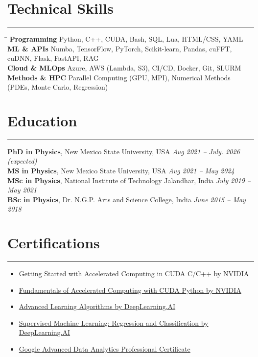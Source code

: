 \documentclass[11pt]{article}
\begin{document}
\section*{Technical Skills}
\hrule
\vspace{-0.3em}
\begin{tabbing}
\hspace{3.5cm} \= \kill
\textbf{Programming} \> Python, C++, CUDA, Bash, SQL, Lua, HTML/CSS, YAML \\
\textbf{ML \& APIs} \> Numba, TensorFlow, PyTorch, Scikit-learn, Pandas, cuFFT, cuDNN, Flask, FastAPI, RAG\\
\textbf{Cloud \& MLOps} \> Azure, AWS (Lambda, S3), CI/CD, Docker, Git, SLURM\\
\textbf{Methods \& HPC} \> Parallel Computing (GPU, MPI), Numerical Methods (PDEs, Monte Carlo, Regression)
\end{tabbing}

\section*{Education}
\hrule
\vspace{0.3em}

\textbf{PhD in Physics}, New Mexico State University, USA \hfill \textit{Aug 2021 – July. 2026 (expected)} \\
\textbf{MS in Physics}, New Mexico State University, USA \hfill \textit{Aug 2021 – May 2024} \\
\textbf{MSc in Physics}, National Institute of Technology Jalandhar, India \hfill \textit{July 2019 – May 2021} \\
\textbf{BSc in Physics}, Dr. N.G.P. Arts and Science College, India \hfill \textit{June 2015 – May 2018}


\section*{Certifications}
\hrule
\vspace{-0.3em}
\begin{itemize}
    \item Getting Started with Accelerated Computing in CUDA C/C++ by NVIDIA
    \item \href{https://learn.nvidia.com/certificates?id=mMWLgny_SEC5DgHXY9XYEw}{Fundamentals of Accelerated Computing with CUDA Python by NVIDIA} 
    \item \href{https://www.coursera.org/account/accomplishments/verify/XG3YT41S0PF5}{Advanced Learning Algorithms by DeepLearning.AI} 
    \item \href{https://coursera.org/share/b9cffe9c5ba5832ffb99bf7abdd8c384}{Supervised Machine Learning: Regression and Classification by DeepLearning.AI} 
    \item \href{https://www.coursera.org/account/accomplishments/professional-cert/certificate/U0HU8UKT89L4}{Google Advanced Data Analytics Professional Certificate} 
\end{itemize}
\end{document}
